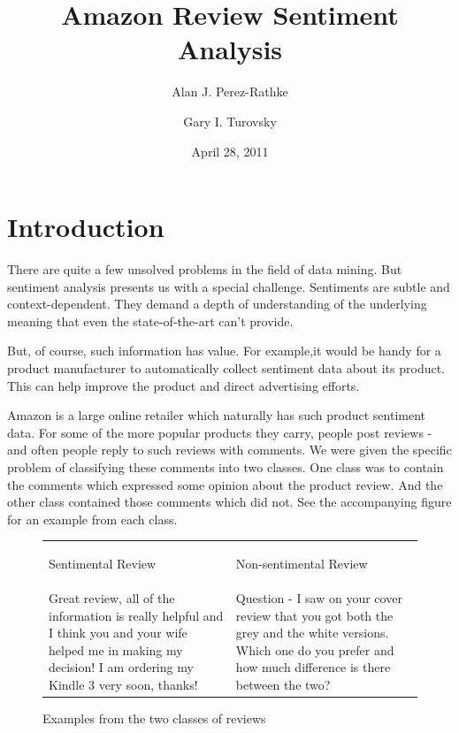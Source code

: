 \documentclass[]{report}
\begin{document}
\title{Amazon Review Sentiment Analysis} 
\author{Alan J. Perez-Rathke \and Gary I. Turovsky}
\date{April 28, 2011}   
\maketitle


\section{Introduction} 
There are quite a few unsolved problems in the field of data mining.  But sentiment analysis presents us with a special challenge.  Sentiments are subtle and context-dependent.  They demand a depth of understanding of the underlying meaning that even the state-of-the-art can't provide.

But, of course, such information has value. For example,it would be handy for a product manufacturer to automatically collect sentiment data about its product.  This can help improve the product and direct advertising efforts.

Amazon is a large online retailer which naturally has such product sentiment data.  For some of the more popular products they carry, people post reviews - and often people reply to such reviews with comments.  We were given the specific problem of classifying these comments into two classes.  One class was to contain the comments which expressed some opinion about the product review.  And the other class contained those comments which did not.  See the accompanying figure for an example from each class.


\begin{figure}[h]
	\begin{center}
		\begin{tabular}{ p{5 cm}  p{5 cm} }
			\begin{center}Sentimental Review\end{center} & 
			\begin{center}Non-sentimental Review\end{center}\\
			Great review, all of the information is really helpful and I think you and your wife helped me in making my decision! I am ordering my Kindle 3 very soon, thanks!
			& 
			Question - I saw on your cover review that you got both the grey and the white versions. Which one do you prefer and how much difference is there between the two?  \\
		\end{tabular}
	\end{center}
	\caption{Examples from the two classes of reviews}
	\label{figExampleReviews}
\end{figure}
\end{document}
